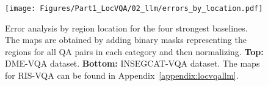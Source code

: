 \begin{figure}[!b]
\begin{center}
\texttt{[image: Figures/Part1\_LocVQA/02\_llm/errors\_by\_location.pdf]}
\caption{Error analysis by region location for the four strongest baselines. The maps are obtained by adding binary masks representing the regions for all QA pairs in each category and then normalizing. \textbf{Top:} DME-VQA dataset. \textbf{Bottom:} INSEGCAT-VQA dataset. The maps for RIS-VQA can be found in Appendix~\ref{appendix:locvqallm}.}
\label{fig:locvqallm_errors_by_location}
\end{center}
\end{figure}


